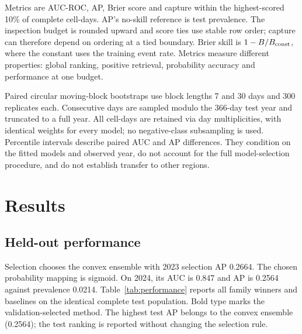 \documentclass[conference]{IEEEtran}
\begin{document}
Metrics are AUC-ROC, AP, Brier score and capture within the highest-scored 10\% of complete cell-days. AP's no-skill reference is test prevalence. The inspection budget is rounded upward and score ties use stable row order; capture can therefore depend on ordering at a tied boundary. Brier skill is $1-B/B_{\rm const}$, where the constant uses the training event rate. Metrics measure different properties: global ranking, positive retrieval, probability accuracy and performance at one budget.

Paired circular moving-block bootstraps use block lengths 7 and 30 days and 300 replicates each. Consecutive days are sampled modulo the 366-day test year and truncated to a full year. All cell-days are retained via day multiplicities, with identical weights for every model; no negative-class subsampling is used. Percentile intervals describe paired AUC and AP differences. They condition on the fitted models and observed year, do not account for the full model-selection procedure, and do not establish transfer to other regions.

\section{Results}
\subsection{Held-out performance}
Selection chooses the convex ensemble with 2023 selection AP 0.2664. The chosen probability mapping is sigmoid. On 2024, its AUC is 0.847 and AP is 0.2564 against prevalence 0.0214. Table~\ref{tab:performance} reports all family winners and baselines on the identical complete test population. Bold type marks the validation-selected method. The highest test AP belongs to the convex ensemble (0.2564); the test ranking is reported without changing the selection rule.
\end{document}
